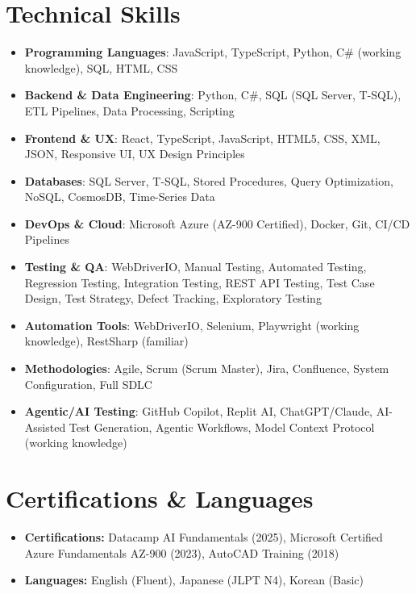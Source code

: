 \documentclass[letterpaper,11pt]{article}
\newcommand{\resumeSubHeadingListStart}{\begin{itemize}[leftmargin=*]}
\newcommand{\resumeSubHeadingListEnd}{\end{itemize}}
\begin{document}
\section{Technical Skills}
 \resumeSubHeadingListStart
   \item{
     \textbf{Programming Languages}{: JavaScript, TypeScript, Python, C\# (working knowledge), SQL, HTML, CSS}
   }
   \item{
     \textbf{Backend \& Data Engineering}{: Python, C\#, SQL (SQL Server, T-SQL), ETL Pipelines, Data Processing, Scripting}
   }
   \item{
     \textbf{Frontend \& UX}{: React, TypeScript, JavaScript, HTML5, CSS, XML, JSON, Responsive UI, UX Design Principles}
   }
   \item{
     \textbf{Databases}{: SQL Server, T-SQL, Stored Procedures, Query Optimization, NoSQL, CosmosDB, Time-Series Data}
   }
   \item{
     \textbf{DevOps \& Cloud}{: Microsoft Azure (AZ-900 Certified), Docker, Git, CI/CD Pipelines}
   }
   \item{
     \textbf{Testing \& QA}{: WebDriverIO, Manual Testing, Automated Testing, Regression Testing, Integration Testing, REST API Testing, Test Case Design, Test Strategy, Defect Tracking, Exploratory Testing}
}
    \item{
    \textbf{Automation Tools}{: WebDriverIO, Selenium, Playwright (working knowledge), RestSharp (familiar)}
}
   \item{
     \textbf{Methodologies}{: Agile, Scrum (Scrum Master), Jira, Confluence, System Configuration, Full SDLC}
   }
   \item{
  \textbf{Agentic/AI Testing}{: GitHub Copilot, Replit AI, ChatGPT/Claude, AI-Assisted Test Generation, Agentic Workflows, Model Context Protocol (working knowledge)}
}
 \resumeSubHeadingListEnd

\section{Certifications \& Languages}
  \resumeSubHeadingListStart
    \item{
      \textbf{Certifications: } Datacamp AI Fundamentals (2025), Microsoft Certified Azure Fundamentals AZ-900 (2023), AutoCAD Training (2018)
    }
    \item{
      \textbf{Languages: } English (Fluent), Japanese (JLPT N4), Korean (Basic)
    }
  \resumeSubHeadingListEnd
\end{document}
